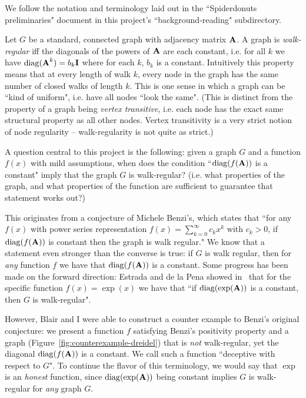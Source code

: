 
We follow the notation and terminology laid out in the ``Spiderdonuts preliminaries" document in this project's ``background-reading" subdirectory.

Let $G$ be a standard, connected graph with adjacency matrix $\textbf{A}$. A graph is \emph{walk-regular} iff the diagonals of the powers of $\textbf{A}$ are each constant, i.e. for all $k$ we have $\operatorname{diag}( \textbf{A}^k ) = b_k \textbf{I}$ where for each $k$, $b_k$ is a constant. Intuitively this property means that at every length of walk $k$, every node in the graph has the same number of closed walks of length $k$. This is one sense in which a graph can be ``kind of uniform", i.e. have all nodes ``look the same". (This is distinct from the property of a graph being \emph{vertex transitive}, i.e. each node has the exact same structural property as all other nodes. Vertex transitivity is a very strict notion of node regularity -- walk-regularity is not quite as strict.)


A question central to this project is the following: given a graph $G$ and a function $f(x)$ with mild assumptions, when does the condition ``$\operatorname{diag}( f(\textbf{A}) )$ is a constant" imply that the graph $G$ is walk-regular? (i.e. what properties of the graph, and what properties of the function are sufficient to guarantee that statement works out?)

This originates from a conjecture of Michele Benzi's, which states that ``for any $f(x)$ with power series representation $f(x) = \sum_{k=0}^{\infty} c_k x^k$ with $c_k > 0$, if $\operatorname{diag}( f(\textbf{A}) )$ is constant then the graph is walk regular."
We know that a statement even stronger than the converse is true: if $G$ is walk regular, then for \emph{any} function $f$ we have that $\operatorname{diag}(f(\textbf{A}))$ is a constant.
Some progress has been made on the forward direction: Estrada and de la Pena showed in~\cite{estrada2014maximum} that for the specific function $f(x) = \exp(x)$ we have that ``if $\operatorname{diag}(\exp(\textbf{A}))$ is a constant, then $G$ is walk-regular".

However, Blair and I were able to construct a counter example to Benzi's original conjecture: we present a function $f$ satisfying Benzi's positivity property and a graph (Figure~\ref{fig:counterexample-dreidel}) that is \emph{not} walk-regular, yet the diagonal $\operatorname{diag}(f(\textbf{A}))$ is a constant. We call such a function ``deceptive with respect to $G$". To continue the flavor of this terminology, we would say that $\exp$ is an \emph{honest} function, since $\operatorname{diag}(\exp(\textbf{A}))$ being constant implies $G$ is walk-regular for \emph{any} graph $G$.

